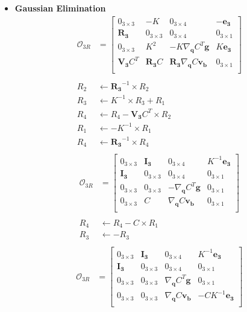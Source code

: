 \documentclass[]{article}
\begin{document}
\begin{itemize}
	\item \textbf{Gaussian Elimination}
	\begin{align*}
	\mathcal{O}_{3R} &= \begin{bmatrix}
	0_{3\times 3}& -K& 0_{3\times 4}& -\bm{e_3}\\
	\bm{R_3} & 0_{3\times 3} & 0_{3\times 4} & 0_{3\times 1}\\
	0_{3\times 3}& K^2& -K\nabla_{\bm{q}} C^T\bm{g}& K\bm{e_3}\\
	\bm{V_3} C^T & \bm{R_3}C & \bm{R_3}\nabla_{\bm{q}} C\bm{v_b} & 0_{3\times 1}\\
	\end{bmatrix}\\
	\\
	R_2&\leftarrow \bm{R_3}^{-1}\times R_2\\	R_3&\leftarrow K^{-1}\times R_3 + R_1\\
	R_4&\leftarrow R_4 - \bm{V_3}C^T\times R_2\\
	R_1&\leftarrow -K^{-1}\times R_1\\
	R_4&\leftarrow \bm{R_3}^{-1}\times R_4\\
	\end{align*}
	\begin{align*}
	\mathcal{O}_{3R} &= \begin{bmatrix}
	0_{3\times 3}& \bm{I_3}& 0_{3\times 4}& K^{-1}\bm{e_3}\\
	\bm{I_3} & 0_{3\times 3} & 0_{3\times 4} & 0_{3\times 1}\\
	0_{3\times 3}& 0_{3\times 3}& -\nabla_{\bm{q}} C^T\bm{g}& 0_{3\times 1}\\
	0_{3\times 3} & C & \nabla_{\bm{q}} C\bm{v_b} & 0_{3\times 1}\\
	\end{bmatrix}\\
	\\
	R_4&\leftarrow R_4 - C\times R_1\\
	R_3&\leftarrow -R_3 \\
	\end{align*}
	\begin{align*}
	\mathcal{O}_{3R} &= \begin{bmatrix}
	0_{3\times 3}& \bm{I_3}& 0_{3\times 4}& K^{-1}\bm{e_3}\\
	\bm{I_3} & 0_{3\times 3} & 0_{3\times 4} & 0_{3\times 1}\\
	0_{3\times 3}& 0_{3\times 3}& \nabla_{\bm{q}} C^T\bm{g}& 0_{3\times 1}\\
	0_{3\times 3} & 0_{3\times 3} & \nabla_{\bm{q}} C\bm{v_b} & -CK^{-1}\bm{e_3}\\

\end{bmatrix}
\end{align*}
\end{itemize}
\end{document}
